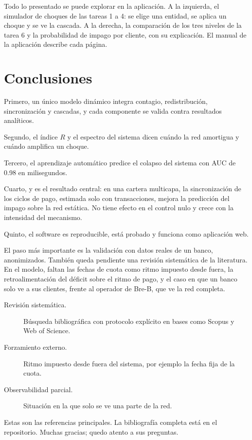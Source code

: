 \begin{decir}
Todo lo presentado se puede explorar en la aplicación. A la izquierda, el simulador de
choques de las tareas 1 a 4: se elige una entidad, se aplica un choque y se ve la
cascada. A la derecha, la comparación de los tres niveles de la tarea 6 y la
probabilidad de impago por cliente, con su explicación. El manual de la aplicación
describe cada página.
\end{decir}

\section{Conclusiones}

\begin{decir}
Primero, un único modelo dinámico integra contagio, redistribución, sincronización y
cascadas, y cada componente se valida contra resultados analíticos.

Segundo, el índice $R$ y el espectro del sistema dicen cuándo la red amortigua y cuándo
amplifica un choque.

Tercero, el aprendizaje automático predice el colapso del sistema con AUC de 0.98 en
milisegundos.

Cuarto, y es el resultado central: en una cartera multicapa, la sincronización de los
ciclos de pago, estimada solo con transacciones, mejora la predicción del impago sobre la
red estática. No tiene efecto en el control nulo y crece con la intensidad del
mecanismo.

Quinto, el software es reproducible, está probado y funciona como aplicación web.
\end{decir}

\begin{decir}
El paso más importante es la validación con datos reales de un banco, anonimizados.
También queda pendiente una revisión sistemática de la literatura. En el modelo, faltan
las fechas de cuota como ritmo impuesto desde fuera, la retroalimentación del déficit
sobre el ritmo de pago, y el caso en que un banco solo ve a sus clientes, frente al
operador de Bre-B, que ve la red completa.
\end{decir}
\begin{terminos}
\begin{description}
\item[Revisión sistemática.] Búsqueda bibliográfica con protocolo explícito en bases como
Scopus y Web of Science.
\item[Forzamiento externo.] Ritmo impuesto desde fuera del sistema, por ejemplo la fecha
fija de la cuota.
\item[Observabilidad parcial.] Situación en la que solo se ve una parte de la red.
\end{description}
\end{terminos}

\begin{decir}
Estas son las referencias principales. La bibliografía completa está en el repositorio.
Muchas gracias; quedo atento a sus preguntas.
\end{decir}
